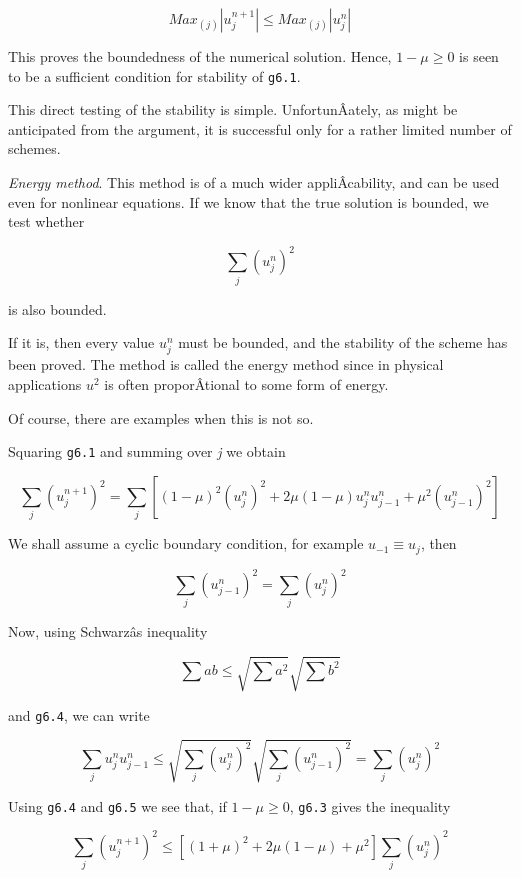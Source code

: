 \[{Max}_{(j)} \left| u_{j}^{n + 1} \right| \leq {Max}_{(j)}\left| u_{j}^{n} \right|\]

This proves the boundedness of the numerical solution. Hence,
\(1 - \mu \geq 0\) is seen to be a sufficient condition for stability of
\texttt{g6.1}.

This direct testing of the stability is simple. UnfortunÂ­ately, as might
be anticipated from the argument, it is successful only for a rather
limited number of schemes.

\emph{Energy method}. This method is of a much wider appliÂ­cability, and
can be used even for nonlinear equations. If we know that the true
solution is bounded, we test whether

\[{\sum_{j}^{}\left( u_{j}^{n} \right)}^{2}\]

is also bounded.

If it is, then every value \(u_{j}^{n}\) must be bounded, and the
stability of the scheme has been proved. The method is called the energy
method since in physical applications \(u^{2}\) is often proporÂ­tional
to some form of energy.

Of course, there are examples when this is not so.

Squaring \texttt{g6.1} and summing over \emph{j} we obtain

{\[{\sum_{j}^{}\left( u_{j}^{n + 1} \right)}^{2} =
\sum_{j}^{}\left\lbrack \left( 1 - \mu \right)^{2}\left( u_{j}^{n} \right)^{2} + 
2\mu\left( 1 - \mu \right)u_{j}^{n}u_{j - 1}^{n} + \mu^{2}\left( u_{j - 1}^{n} \right)^{2} \right\rbrack\]}

We shall assume a cyclic boundary condition, for example
\(u_{- 1} \equiv u_{j}\), then

{\[{\sum_{j}^{}\left( u_{j - 1}^{n} \right)}^{2} =  {\sum_{j}^{}\left( u_{j}^{n} \right)}^{2}\]}

Now, using Schwarzâs inequality

\[\sum_{}^{}{ab \leq \sqrt{\sum_{}^{}a^{2}}}\sqrt{\sum_{}^{}b^{2}}\]

and \texttt{g6.4}, we can write

{\[\sum_{j}^{}u_{j}^{n}u_{j - 1}^{n} \leq \sqrt{\sum_{j}^{}\left( u_{j}^{n} \right)^{2}}\sqrt{\sum_{j}^{}
\left( u_{j - 1}^{n} \right)^{2}} =\sum_{j}^{}\left( u_{j}^{n} \right)^{2}\]}

Using \texttt{g6.4} and \texttt{g6.5} we see that, if
\(1 - \mu \geq 0\), \texttt{g6.3} gives the inequality

\[{\sum_{j}^{}\left( u_{j}^{n + 1} \right)}^{2} \leq \left\lbrack \left( 1 + \mu \right)^{2} +
2\mu\left( 1 - \mu \right) + \mu^{2} \right\rbrack\sum_{j}^{}\left( u_{j}^{n} \right)^{2}\]


